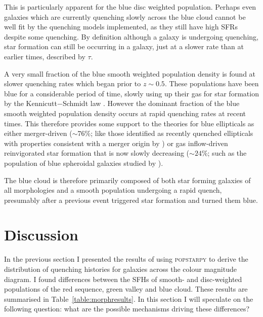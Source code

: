 This is particularly apparent for the blue disc weighted population. Perhaps even galaxies which are currently quenching slowly across the blue cloud cannot be well fit by the quenching models implemented, as they still have high SFRs despite some quenching. By definition although a galaxy is undergoing quenching, star formation can still be occurring in a galaxy, just at a slower rate than at earlier times, described by $\tau$.

A very small fraction of the blue smooth weighted population density is found at slower quenching rates which began prior to $z \sim 0.5 $. These populations have been blue for a considerable period of time, slowly using up their gas for star formation by the Kennicutt$-$Schmidt law \citep{Schmidt59, Kennicutt97}. However the dominant fraction of the blue smooth weighted population density occurs at rapid quenching rates at recent times. This therefore provides some support to the theories for blue ellipticals as either merger-driven ($\sim76\%$; like those identified as recently quenched ellipticals with properties consistent with a merger origin by \citealt{McIntosh14}) or gas inflow-driven reinvigorated star formation that is now slowly decreasing ($\sim24\%$; such as the population of blue spheroidal galaxies studied by \citealt{Kaviraj13}).

The blue cloud is therefore primarily composed of both star forming galaxies of all morphologies and a smooth population undergoing a rapid quench, presumably after a previous event triggered star formation and turned them blue.


\section{Discussion}\label{morph:discussion}

In the previous section I presented the results of using \textsc{popstarpy} to derive the distribution of quenching histories for galaxies across the colour magnitude diagram. I  found differences between the SFHs of smooth- and disc-weighted populations of the red sequence, green valley and blue cloud. These results are summarised in Table~\ref{table:morphresults}. In this section I will speculate on the following question: what are the possible mechanisms driving these differences? 

